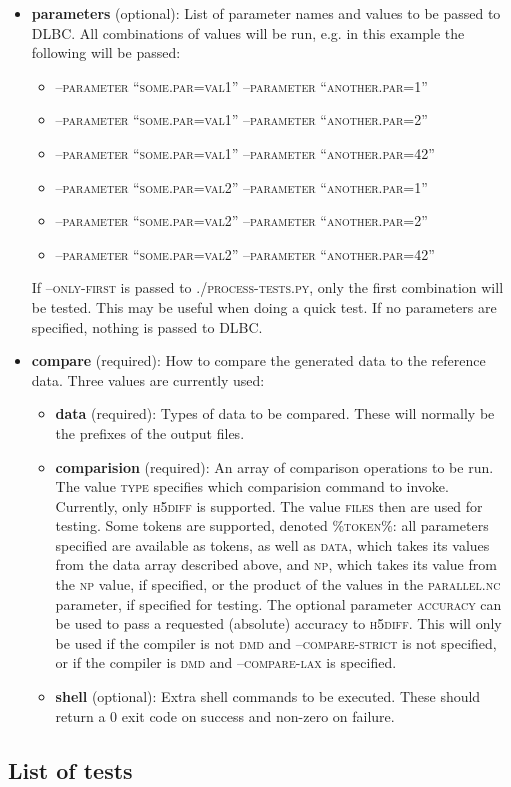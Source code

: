 \documentclass{article}
\begin{document}
\begin{itemize}
\item \textbf{parameters} (optional): List of parameter names and values to be passed to DLBC. All combinations of values will be run, e.g. in this example the following will be passed:
\begin{itemize}
\item \textsc{--parameter ``some.par=val1'' --parameter ``another.par=1''}
\item \textsc{--parameter ``some.par=val1'' --parameter ``another.par=2''}
\item \textsc{--parameter ``some.par=val1'' --parameter ``another.par=42''}
\item \textsc{--parameter ``some.par=val2'' --parameter ``another.par=1''}
\item \textsc{--parameter ``some.par=val2'' --parameter ``another.par=2''}
\item \textsc{--parameter ``some.par=val2'' --parameter ``another.par=42''}
\end{itemize}
If \textsc{--only-first} is passed to \textsc{./process-tests.py}, only the first combination will be tested. This may be useful when doing a quick test. If no parameters are specified, nothing is passed to DLBC.
\item \textbf{compare} (required): How to compare the generated data to the reference data. Three values are currently used:
\begin{itemize}
\item \textbf{data} (required): Types of data to be compared. These will normally be the prefixes of the output files.
\item \textbf{comparision} (required): An array of comparison operations to be run. The value \textsc{type} specifies which comparision command to invoke. Currently, only \textsc{h5diff} is supported. The value \textsc{files} then are used for testing. Some tokens are supported, denoted \textsc{\%token\%}: all parameters specified are available as tokens, as well as \textsc{data}, which takes its values from the data array described above, and \textsc{np}, which takes its value from the \textsc{np} value, if specified, or the product of the values in the \textsc{parallel.nc} parameter, if specified for testing. The optional parameter \textsc{accuracy} can be used to pass a requested (absolute) accuracy to \textsc{h5diff}. This will only be used if the compiler is not \textsc{dmd} and \textsc{--compare-strict} is not specified, or if the compiler is \textsc{dmd} and \textsc{--compare-lax} is specified.
\item \textbf{shell} (optional): Extra shell commands to be executed. These should return a 0 exit code on success and non-zero on failure.
\end{itemize}
\end{itemize}


\subsection{List of tests}


\end{document}
